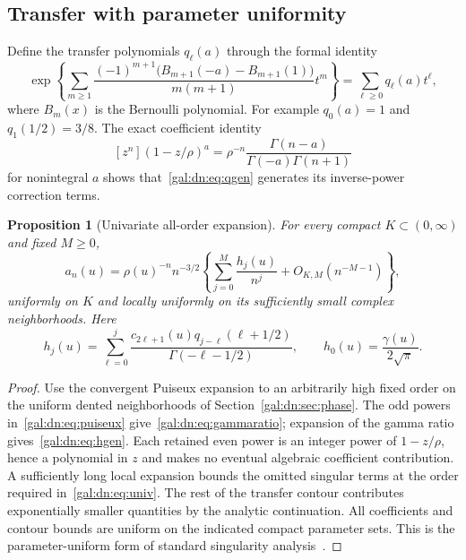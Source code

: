 \documentclass[11pt,letterpaper]{article}
\numberwithin{equation}{section}
\newtheorem{proposition}[theorem]{Proposition}
\theoremstyle{definition}\newtheorem{definition}[theorem]{Definition}
\theoremstyle{remark}\newtheorem{remark}[theorem]{Remark}
\begin{document}
\subsection{Transfer with parameter uniformity}
Define the transfer polynomials $q_\ell(a)$ through the formal identity
\begin{equation}\label{gal:dn:eq:qgen}
 \exp\left\{\sum_{m\geq1}
 \frac{(-1)^{m+1}\bigl(B_{m+1}(-a)-B_{m+1}(1)\bigr)}{m(m+1)}t^m\right\}
 =\sum_{\ell\geq0}q_\ell(a)t^\ell,
\end{equation}
where $B_m(x)$ is the Bernoulli polynomial. For example $q_0(a)=1$ and $q_1(1/2)=3/8$. The exact coefficient identity
\begin{equation}\label{gal:dn:eq:gammaratio}
 [z^n](1-z/\rho)^a
 =\rho^{-n}\frac{\Gamma(n-a)}{\Gamma(-a)\Gamma(n+1)}
\end{equation}
for nonintegral $a$ shows that~\eqref{gal:dn:eq:qgen} generates its inverse-power correction terms.

\begin{proposition}[Univariate all-order expansion]\label{gal:dn:prop:transfer}
For every compact $K\subset(0,\infty)$ and fixed $M\geq0$,
\begin{equation}\label{gal:dn:eq:univ}
 a_n(u)=\rho(u)^{-n}n^{-3/2}
 \left\{\sum_{j=0}^M\frac{h_j(u)}{n^j}+O_{K,M}(n^{-M-1})\right\},
\end{equation}
uniformly on $K$ and locally uniformly on its sufficiently small complex neighborhoods. Here
\begin{equation}\label{gal:dn:eq:hgen}
 h_j(u)=\sum_{\ell=0}^j
 \frac{c_{2\ell+1}(u)q_{j-\ell}(\ell+1/2)}{\Gamma(-\ell-1/2)},
 \qquad h_0(u)=\frac{\gamma(u)}{2\sqrt\pi}.
\end{equation}
\end{proposition}
\begin{proof}
Use the convergent Puiseux expansion to an arbitrarily high fixed order on the uniform dented neighborhoods of Section~\ref{gal:dn:sec:phase}. The odd powers in~\eqref{gal:dn:eq:puiseux} give~\eqref{gal:dn:eq:gammaratio}; expansion of the gamma ratio gives~\eqref{gal:dn:eq:hgen}. Each retained even power is an integer power of $1-z/\rho$, hence a polynomial in $z$ and makes no eventual algebraic coefficient contribution. A sufficiently long local expansion bounds the omitted singular terms at the order required in~\eqref{gal:dn:eq:univ}. The rest of the transfer contour contributes exponentially smaller quantities by the analytic continuation. All coefficients and contour bounds are uniform on the indicated compact parameter sets. This is the parameter-uniform form of standard singularity analysis~\cite{FS}.
\end{proof}
\end{document}
